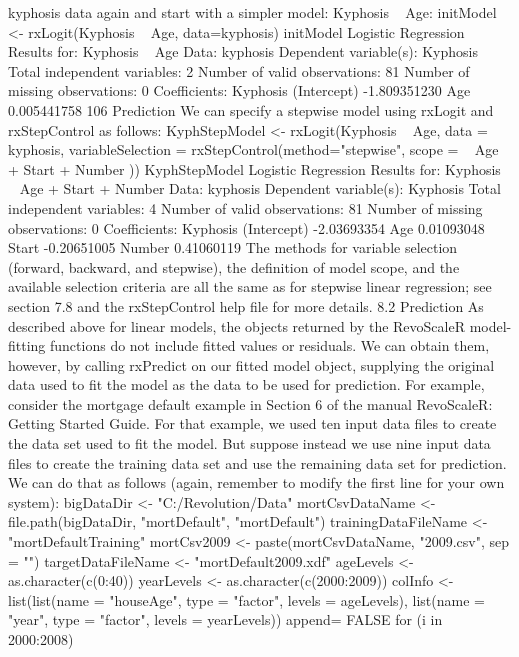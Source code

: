 kyphosis data again and start with a simpler model: Kyphosis ~ Age:
initModel <- rxLogit(Kyphosis ~ Age, data=kyphosis)
initModel
Logistic Regression Results for: Kyphosis ~ Age
Data: kyphosis
Dependent variable(s): Kyphosis
Total independent variables: 2
Number of valid observations: 81
Number of missing observations: 0
Coefficients:
 Kyphosis
(Intercept) -1.809351230
Age 0.005441758
106 Prediction
We can specify a stepwise model using rxLogit and rxStepControl as follows:
KyphStepModel <- rxLogit(Kyphosis ~ Age,
data = kyphosis,
variableSelection = rxStepControl(method="stepwise",
scope = ~ Age + Start + Number ))
KyphStepModel
Logistic Regression Results for: Kyphosis ~ Age + Start + Number
Data: kyphosis
Dependent variable(s): Kyphosis
Total independent variables: 4
Number of valid observations: 81
Number of missing observations: 0
Coefficients:
 Kyphosis
(Intercept) -2.03693354
Age 0.01093048
Start -0.20651005
Number 0.41060119
The methods for variable selection (forward, backward, and stepwise), the definition of model
scope, and the available selection criteria are all the same as for stepwise linear regression; see
section 7.8 and the rxStepControl help file for more details.
8.2 Prediction
As described above for linear models, the objects returned by the RevoScaleR model-fitting
functions do not include fitted values or residuals. We can obtain them, however, by calling
rxPredict on our fitted model object, supplying the original data used to fit the model as the
data to be used for prediction.
For example, consider the mortgage default example in Section 6 of the manual RevoScaleR:
Getting Started Guide. For that example, we used ten input data files to create the data set
used to fit the model. But suppose instead we use nine input data files to create the training
data set and use the remaining data set for prediction. We can do that as follows (again,
remember to modify the first line for your own system):
bigDataDir <- "C:/Revolution/Data"
mortCsvDataName <- file.path(bigDataDir, "mortDefault", "mortDefault")
trainingDataFileName <- "mortDefaultTraining"
mortCsv2009 <- paste(mortCsvDataName, "2009.csv", sep = "")
targetDataFileName <- "mortDefault2009.xdf"
ageLevels <- as.character(c(0:40))
yearLevels <- as.character(c(2000:2009))
colInfo <- list(list(name = "houseAge", type = "factor",
 levels = ageLevels), list(name = "year", type = "factor",
 levels = yearLevels))
append= FALSE
for (i in 2000:2008)
